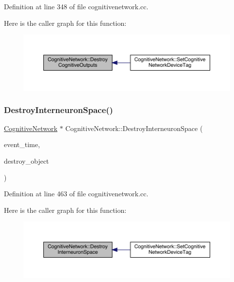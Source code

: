 Definition at line 348 of file cognitivenetwork.\+cc.

Here is the caller graph for this function\+:
\nopagebreak
\begin{figure}[H]
\begin{center}
\leavevmode
\includegraphics[width=350pt]{class_cognitive_network_ad08191cbab02f26f69d25bc7e6b5c1ee_icgraph}
\end{center}
\end{figure}
\mbox{\label{class_cognitive_network_acdda154177d3b3a92885c10f6b3dc274}} 
\subsubsection{\texorpdfstring{Destroy\+Interneuron\+Space()}{DestroyInterneuronSpace()}}
{\footnotesize\ttfamily \hyperlink{class_cognitive_network}{Cognitive\+Network} $\ast$ Cognitive\+Network\+::\+Destroy\+Interneuron\+Space (\begin{DoxyParamCaption}\item[{std\+::chrono\+::time\+\_\+point$<$ \hyperlink{universe_8h_a0ef8d951d1ca5ab3cfaf7ab4c7a6fd80}{Clock} $>$}]{event\+\_\+time,  }\item[{\hyperlink{class_cognitive_network}{Cognitive\+Network} $\ast$}]{destroy\+\_\+object }\end{DoxyParamCaption})}



Definition at line 463 of file cognitivenetwork.\+cc.

Here is the caller graph for this function\+:
\nopagebreak
\begin{figure}[H]
\begin{center}
\leavevmode
\includegraphics[width=350pt]{class_cognitive_network_acdda154177d3b3a92885c10f6b3dc274_icgraph}
\end{center}
\end{figure}
\mbox{\label{class_cognitive_network_a718833496332e0471186c9a886005c4a}} 
